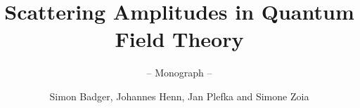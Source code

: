 \documentclass[graybox,envcountchap,sectrefs]{svmono-arxiv}
\begin{document}
\author{Simon Badger, Johannes Henn, Jan Plefka and Simone Zoia}
\title{Scattering Amplitudes in Quantum Field Theory}
\subtitle{-- Monograph --}
\maketitle

\frontmatter%


%



\tableofcontents



\mainmatter%
%







%




%




%
%

\end{document}
